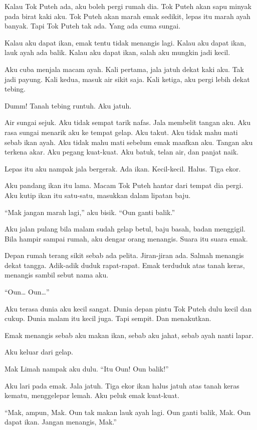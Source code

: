 \documentclass[
  11pt,
  a5paper,
  openany,
  oneside]{book}
\begin{document}
Kalau Tok Puteh ada, aku boleh pergi rumah dia. Tok Puteh akan sapu
minyak pada birat kaki aku. Tok Puteh akan marah emak sedikit, lepas itu
marah ayah banyak. Tapi Tok Puteh tak ada. Yang ada cuma sungai.

Kalau aku dapat ikan, emak tentu tidak menangis lagi. Kalau aku dapat
ikan, lauk ayah ada balik. Kalau aku dapat ikan, salah aku mungkin jadi
kecil.

Aku cuba menjala macam ayah. Kali pertama, jala jatuh dekat kaki aku.
Tak jadi payung. Kali kedua, masuk air sikit saja. Kali ketiga, aku
pergi lebih dekat tebing.

Dumm! Tanah tebing runtuh. Aku jatuh.

Air sungai sejuk. Aku tidak sempat tarik nafas. Jala membelit tangan
aku. Aku rasa sungai menarik aku ke tempat gelap. Aku takut. Aku tidak
mahu mati sebab ikan ayah. Aku tidak mahu mati sebelum emak maafkan aku.
Tangan aku terkena akar. Aku pegang kuat-kuat. Aku batuk, telan air, dan
panjat naik.

Lepas itu aku nampak jala bergerak. Ada ikan. Kecil-kecil. Halus. Tiga
ekor.

Aku pandang ikan itu lama. Macam Tok Puteh hantar dari tempat dia pergi.
Aku kutip ikan itu satu-satu, masukkan dalam lipatan baju.

``Mak jangan marah lagi,'' aku bisik. ``Oun ganti balik.''

Aku jalan pulang bila malam sudah gelap betul, baju basah, badan
menggigil. Bila hampir sampai rumah, aku dengar orang menangis. Suara
itu suara emak.

Depan rumah terang sikit sebab ada pelita. Jiran-jiran ada. Salmah
menangis dekat tangga. Adik-adik duduk rapat-rapat. Emak terduduk atas
tanah keras, menangis sambil sebut nama aku.

``Oun\ldots{} Oun\ldots''

Aku terasa dunia aku kecil sangat. Dunia depan pintu Tok Puteh dulu
kecil dan cukup. Dunia malam itu kecil juga. Tapi sempit. Dan
menakutkan.

Emak menangis sebab aku makan ikan, sebab aku jahat, sebab ayah nanti
lapar.

Aku keluar dari gelap.

Mak Limah nampak aku dulu. ``Itu Oun! Oun balik!''

Aku lari pada emak. Jala jatuh. Tiga ekor ikan halus jatuh atas tanah
keras kematu, menggelepar lemah. Aku peluk emak kuat-kuat.

``Mak, ampun, Mak. Oun tak makan lauk ayah lagi. Oun ganti balik, Mak.
Oun dapat ikan. Jangan menangis, Mak.''
\end{document}
